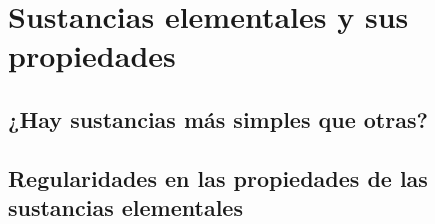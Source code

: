 \thispagestyle{plain}
\section{Sustancias elementales y sus propiedades}

\subsection{¿Hay sustancias más simples que otras?}
\subsection{Regularidades en las propiedades de las sustancias elementales}\newpage \thispagestyle{plain}
\newpage
